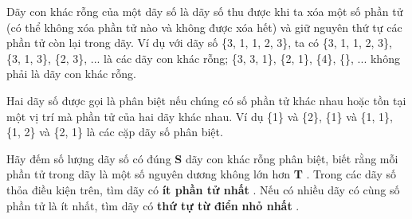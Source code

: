 Dãy con khác rỗng của một dãy số là dãy số thu được khi ta xóa một số phần tử (có thể không xóa phần tử nào và không được xóa hết) và giữ nguyên thứ tự các phần tử còn lại trong dãy. Ví dụ với dãy số \{3, 1, 1, 2, 3\}, ta có \{3, 1, 1, 2, 3\}, \{3, 1, 3\}, \{2, 3\}, ... là các dãy con khác rỗng; \{3, 3, 1\}, \{2, 1\}, \{4\}, \{\}, ... không phải là dãy con khác rỗng.  

   Hai dãy số được gọi là phân biệt nếu chúng có số phần tử khác nhau hoặc tồn tại một vị trí mà phần tử của hai dãy khác nhau. Ví dụ \{1\} và \{2\}, \{1\} và \{1, 1\}, \{1, 2\} và \{2, 1\} là các cặp dãy số phân biệt.  

   Hãy đếm số lượng dãy số có đúng   \textbf{    S   }   dãy con khác rỗng phân biệt, biết rằng mỗi phần tử trong dãy là một số nguyên dương không lớn hơn   \textbf{    T   }   . Trong các dãy số thỏa điều kiện trên, tìm dãy có   \textbf{    ít phần tử nhất   }   . Nếu có nhiều dãy có cùng số phần tử là ít nhất, tìm dãy có   \textbf{    thứ tự từ điển   }\textbf{    nhỏ nhất   }   .
